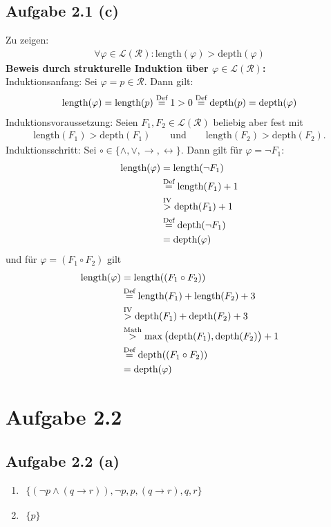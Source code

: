 \documentclass[12pt,a4paper]{article}
\newcommand{\depth}{\text{depth}}
\newcommand{\length}{\text{length}}
\begin{document}
\subsection*{Aufgabe 2.1 (c)}
Zu zeigen:
\begin{align*}
\forall\varphi\in\mathcal{L}(\mathcal{R}):\length(\varphi)>\depth(\varphi)
\end{align*}
\textbf{Beweis durch strukturelle Induktion über $\varphi\in\mathcal{L}(\mathcal{R})$:}\\
Induktionsanfang: Sei $\varphi= p\in\mathcal{R}$. Dann gilt:
\begin{align*}
\length(\varphi)=\length(p)\stackeq{\text{Def}}1>0\stackeq{\text{Def}}\depth(p)=\depth(\varphi)
\end{align*}
Induktionsvoraussetzung: Seien $F_1,F_2\in\mathcal{L}(\mathcal{R})$ beliebig aber fest mit
\begin{align*}
\length(F_1)>\depth(F_1)\qquad\text{und}\qquad\length(F_2)>\depth(F_2).
\end{align*}
Induktionsschritt: Sei $\circ\in\lbrace\wedge,\vee,\to,\leftrightarrow\rbrace$. Dann gilt für $\varphi=\neg F_1:$
\begin{align*}
\length(\varphi)
&=\length(\neg F_1)\\
&\stackeq{\text{Def}}
\length(F_1)+1\\
&\stackrel{\text{IV}}{>}
\depth(F_1)+1\\
&\stackeq{\text{Def}}
\depth(\neg F_1)\\
&=\depth(\varphi)
\end{align*}
und für $\varphi=(F_1\circ F_2)$ gilt
\begin{align*}
\length(\varphi)
&=\length((F_1\circ F_2))\\
&\stackeq{\text{Def}}
\length(F_1)+\length(F_2)+3\\
&\stackrel{\text{IV}}{>}
\depth(F_1)+\depth(F_2)+3\\
&\stackrel{\text{Math}}{>}
\max\big(\depth(F_1),\depth(F_2)\big)+1\\
&\stackeq{\text{Def}}
\depth((F_1\circ F_2))\\
&=\depth(\varphi)
\end{align*}

\section*{Aufgabe 2.2}
\subsection*{Aufgabe 2.2 (a)}
\begin{enumerate}[label=(\arabic*)]
\item $\begin{aligned}
\big\lbrace (\neg p\wedge(q\to r)),\neg p, p, (q\to r),q,r\big\rbrace
\end{aligned}$
\item $\begin{aligned}
\big\lbrace p\big\rbrace
\end{aligned}$
\end{enumerate}
\end{document}
